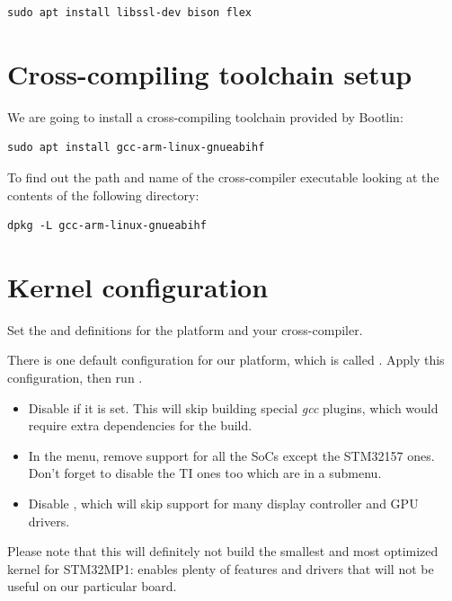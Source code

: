 \begin{verbatim}
sudo apt install libssl-dev bison flex
\end{verbatim}

\section{Cross-compiling toolchain setup}

We are going to install a cross-compiling toolchain provided by Bootlin:

\begin{verbatim}
sudo apt install gcc-arm-linux-gnueabihf
\end{verbatim}


To find out the path and name of the cross-compiler executable looking at the contents of the following directory:

\begin{verbatim}
dpkg -L gcc-arm-linux-gnueabihf
\end{verbatim}

\section{Kernel configuration}

Set the  and  definitions for the 
platform and your cross-compiler.

There is one default configuration for our platform, which is called
. Apply this configuration, then run .

\begin{itemize}
\item Disable  if it is set. This will skip
  building special {\em gcc} plugins, which would require extra dependencies
  for the build.
\item In the  menu, remove support for all the SoCs except
 the STM32157 ones. Don’t forget to disable the TI ones too which are in a submenu.
\item Disable , which will skip support for many display
controller and GPU drivers.
\end{itemize}

Please note that this will definitely not build the smallest and most optimized kernel for STM32MP1:
 enables plenty of features and drivers that will not be useful on our particular board.

